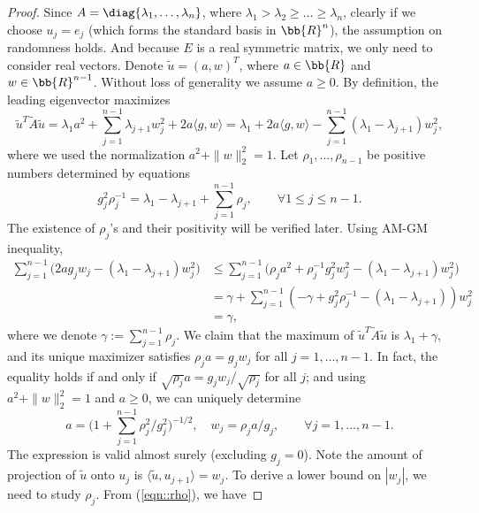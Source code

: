 \documentclass[12pt]{article}%
\theoremstyle{plain}%
\theoremstyle{remark}
\begin{document}
\begin{proof}
Since $A = \diag\{ \lambda_1,\ldots, \lambda_n \}$, where $\lambda_1 > \lambda_2 \ge \ldots \ge \lambda_n$, clearly if we choose $u_j = e_j$ (which forms the standard basis in $\bb{R}^n$), the assumption on randomness holds. And because $E$ is a real symmetric matrix, we only need to consider real vectors. Denote $\tilde{u} = (a, w)^T$, where $a \in \bb{R}$ and $w \in \bb{R}^{n-1}$. Without loss of generality we assume $a \ge 0$. By definition, the leading eigenvector maximizes
\begin{equation*}
\tilde{u}^T \tilde{A} \tilde{u} = \lambda_1 a^2 + \sum_{j=1}^{n-1} \lambda_{j+1} w_j^2 + 2a \langle g, w \rangle = \lambda_1 + 2a \langle g, w \rangle -  \sum_{j=1}^{n-1} (\lambda_1 - \lambda_{j+1}) w_j^2,
\end{equation*}
where we used the normalization $a^2 + \| w \|_2^2 = 1$. Let $\rho_1,\ldots, \rho_{n-1}$ be positive numbers determined by equations
\begin{equation}\label{eqn::rho}
g_j^2 \rho_j^{-1} = \lambda_1- \lambda_{j+1} + \sum_{j =1 }^{n-1} \rho_j, \qquad \forall 1 \le j \le n-1.
\end{equation} 
The existence of $\rho_j$'s and their positivity will be verified later. Using AM-GM inequality,
\begin{align*}
\sum_{j=1}^{n-1} \big( 2a g_j w_j - (\lambda_1 - \lambda_{j+1}) w_j^2 \big) &\le \sum_{j=1}^{n-1} \big(  \rho_j a^2 + \rho_j^{-1} g_j^2 w_j^2 -  (\lambda_1 - \lambda_{j+1}) w_j^2 \big)\\
&= \gamma + \sum_{j=1}^{n-1} ( - \gamma + g_j^2 \rho_j^{-1}- (\lambda_1 - \lambda_{j+1}) ) w_j^2 \\
& = \gamma,
\end{align*}
where we denote $\gamma := \sum_{j =1 }^{n-1} \rho_j$. We claim that the maximum of $\tilde{u}^T \tilde{A} \tilde{u}$ is $\lambda_1 + \gamma$,  and its unique maximizer satisfies $\rho_j a = g_j w_j$ for all $j = 1,\ldots, n-1$. In fact, the equality holds if and only if $\sqrt{\rho_j}a = g_jw_j/\sqrt{\rho_j}$ for all $j$; and using $a^2 + \| w \|_2^2 = 1$ and $a \ge 0$, we can uniquely determine
\begin{equation*}
a = \big( 1 + \sum_{j=1}^{n-1} \rho_j^2 / g_j^2 \big)^{-1/2}, \quad w_j = \rho_j a / g_j, \qquad \forall j=1,\ldots, n-1.
\end{equation*}
The expression is valid almost surely (excluding $g_j = 0$). Note the amount of projection of $\tilde{u}$ onto $u_j$ is $\langle \tilde{u}, u_{j+1} \rangle = w_j$. To derive a lower bound on $|w_j|$, we need to study $\rho_j$. From (\ref{eqn::rho}), we have

\end{proof}
\end{document}
